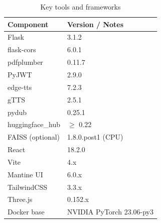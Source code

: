 \documentclass[conference]{IEEEtran}
\begin{document}
\begin{table}[h]
  \centering
  \caption{Key tools and frameworks}
  \label{tab:tools}
  \begin{tabular}{ll}
    \toprule
  Component & Version / Notes \\
    \midrule
  Flask & 3.1.2 \\
  flask-cors & 6.0.1 \\
  pdfplumber & 0.11.7 \\
  PyJWT & 2.9.0 \\
  edge-tts & 7.2.3 \\
  gTTS & 2.5.1 \\
  pydub & 0.25.1 \\
  huggingface\_hub & $\ge$ 0.22 \\
  FAISS (optional) & 1.8.0.post1 (CPU) \\
  React & 18.2.0 \\
  Vite & 4.x \\
  Mantine UI & 6.0.x \\
  TailwindCSS & 3.3.x \\
  Three.js & 0.152.x \\
  Docker base & NVIDIA PyTorch 23.06-py3 \\
    \bottomrule
  \end{tabular}
\end{table}



\end{document}

